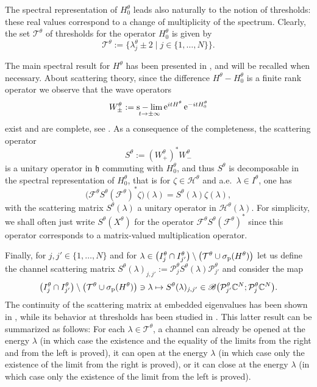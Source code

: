 \documentclass[11pt]{article}
\def\B{\mathscr B}
\def\C{\mathbb C}
\def\F{\mathscr F}
\def\Hrond{\mathscr H}
\def\h{\mathfrak h}
\def\P{\mathcal P}
\def\T{\mathcal T}
\def\e{\mathop{\mathrm{e}}\nolimits}
\DeclareMathOperator*{\slim}{s\hspace{0.1pt}-\hspace{0.1pt}lim}
\begin{document}
The spectral representation of $H^\theta_0$ leads also naturally to the
notion of thresholds: these real values correspond to a change
of multiplicity of the spectrum.
Clearly, the set $\T^\theta$ of thresholds for the operator $H_0^\theta$
is given by
\begin{equation*}
\T^\theta:=\big\{\lambda_j^\theta\pm2\mid j\in\{1,\dots,N\}\big\}.
\end{equation*}

The main spectral result for $H^\theta$ has been presented in \cite[Prop.~1.2]{NRT},
and will be recalled when necessary. About scattering theory, since the difference $H^\theta-H^\theta_0$ is a finite rank
operator we observe that the wave operators
\begin{equation}\label{eq_WO}
W_{\pm}^\theta:=\slim_{t\to\pm\infty}\e^{itH^\theta}\e^{-itH^\theta_0}
\end{equation}
exist and are complete, see  \cite[Thm.~X.4.4]{Kat95}. 
As a consequence of the completeness, the scattering operator
$$
S^\theta:=(W_+^\theta)^*W_-^\theta
$$
is a unitary operator in $\h$ commuting with $H^\theta_0$, and thus $S^\theta$ is
decomposable in the spectral representation of $H^\theta_0$, that is
for $\zeta\in\Hrond^\theta$ and a.e.~$\lambda\in I^\theta$, one has
$$
\big(\F^\theta S^\theta (\F^\theta)^*\zeta\big)(\lambda)=S^\theta(\lambda)\zeta(\lambda),
$$
with the scattering matrix $S^\theta(\lambda)$ a unitary operator in $\Hrond^\theta(\lambda)$.
For simplicity, we shall often just write $S^\theta(X^\theta)$ for the operator 
$\F^\theta S^\theta (\F^\theta)^*$ since this operator corresponds to a matrix-valued multiplication operator.

Finally, for $j,j'\in\{1,\dots,N\}$ and for
$
\lambda\in\big(I^\theta_j\cap I^\theta_{j'}\big)
\setminus\big(\T^\theta\cup\sigma_{\rm p}(H^\theta)\big)
$
let us define the channel scattering matrix
$S^\theta(\lambda)_{j,j'}:=\P^\theta_jS^\theta(\lambda)\P^\theta_{j'}$
and consider the map
$$
\big(I^\theta_j\cap I^\theta_{j'}\big)
\setminus\big(\T^\theta\cup\sigma_{\rm p}(H^\theta)\big)
\ni\lambda\mapsto S^\theta(\lambda)_{j,j'}
\in\B\big(\P_{j'}^\theta\C^N;\P_j^\theta\C^N\big).
$$
The continuity of the scattering matrix at embedded eigenvalues has been shown in 
\cite[Thm.~3.10]{NRT}, while its behavior at thresholds has been studied in 
\cite[Thm.~3.9]{NRT}.
This latter result can be summarized as follows: For each $\lambda\in\T^\theta$, 
a channel can already be opened at the
energy $\lambda$ (in which case the existence and the equality of the
limits from the right and from the left is proved), it can open at the energy $\lambda$ (in
which case only the existence of the limit from the right is proved), or it can
close at the energy $\lambda$ (in which case only the existence of the
limit from the left is proved).
\end{document}
